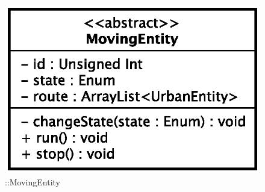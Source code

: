 \begin{figure}[h]
\centering
\includegraphics[scale=0.6,keepaspectratio]{images/solution/moving_entity.eps}
\caption{\pActive::MovingEntity}
\label{fig:sd-app-movingentity}
\end{figure}
\FloatBarrier
